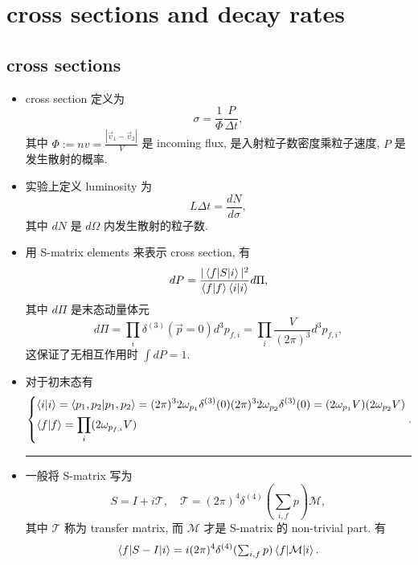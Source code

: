 \chapter{cross sections and decay rates}
\section{cross sections}
\begin{itemize}
	\item cross section 定义为
	\begin{equation} \label{cross sections and decay rates.1.1}
		\sigma = \frac{1}{\Phi} \frac{P}{\Delta t},
	\end{equation}
	其中 $\Phi := n v = \frac{|\vec{v}_1 - \vec{v}_2|}{V}$ 是 incoming flux, 是入射粒子数密度乘粒子速度, $P$ 是发生散射的概率.
	
	\item 实验上定义 luminosity 为
	\begin{equation}
		L \Delta t = \frac{dN}{d\sigma},
	\end{equation}
	其中 $dN$ 是 $d\Omega$ 内发生散射的粒子数.
	
	\item 用 S-matrix elements 来表示 cross section, 有
	\begin{equation}
		dP = \frac{|\braket{f | S | i}|^2}{\braket{f | f} \braket{i | i}} d\Pi,
	\end{equation}
	其中 $d\Pi$ 是末态动量体元
	\begin{equation}
		d\Pi = \prod_i \delta^{(3)}(\vec{p} = 0) d^3 p_{f, i} = \prod_i \frac{V}{(2 \pi)^3} d^3 p_{f, i},
	\end{equation}
	这保证了无相互作用时 $\int dP = 1$.
	
	\item 对于初末态有
	\begin{equation}
		\begin{dcases}
			\braket{i | i} = \braket{p_1, p_2 | p_1, p_2} = (2 \pi)^3 2 \omega_{p_1} \delta^{(3)}(0) (2 \pi)^3 2 \omega_{p_2} \delta^{(3)}(0) = (2 \omega_{p_1} V) (2 \omega_{p_2} V) \\
			\braket{f | f} = \prod_i (2 \omega_{p_{f, i}} V)
		\end{dcases}.
	\end{equation}
	
	\noindent\rule[0.5ex]{\linewidth}{0.5pt} %
	
	\item 一般将 S-matrix 写为
	\begin{equation}
		S = I + i \mathcal{T}, \quad \mathcal{T} = (2 \pi)^4 \delta^{(4)}({\textstyle \sum_{i, f} p}) \mathcal{M},
	\end{equation}
	其中 $\mathcal{T}$ 称为 transfer matrix, 而 $\mathcal{M}$ 才是 S-matrix 的 non-trivial part. 有
	\begin{equation}
		\braket{f | S - I | i} = i (2 \pi)^4 \delta^{(4)}({\textstyle \sum_{i, f} p}) \braket{f | \mathcal{M} | i}.
	\end{equation}
	

\end{itemize}
